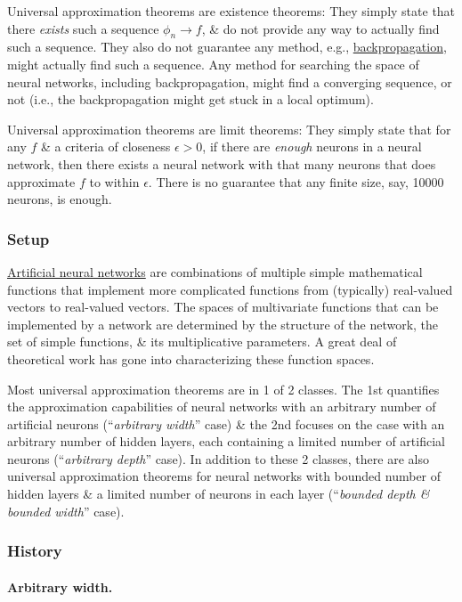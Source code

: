 \documentclass{article}
\begin{document}
Universal approximation theorems are existence theorems: They simply state that there {\it exists} such a sequence $\phi_n\to f$, \& do not provide any way to actually find such a sequence. They also do not guarantee any method, e.g., \href{https://en.wikipedia.org/wiki/Backpropagation}{backpropagation}, might actually find such a sequence. Any method for searching the space of neural networks, including backpropagation, might find a converging sequence, or not (i.e., the backpropagation might get stuck in a local optimum).

Universal approximation theorems are limit theorems: They simply state that for any $f$ \& a criteria of closeness $\epsilon > 0$, if there are {\it enough} neurons in a neural network, then there exists a neural network with that many neurons that does approximate $f$ to within $\epsilon$. There is no guarantee that any finite size, say, 10000 neurons, is enough.

\subsubsection{Setup}
\href{https://en.wikipedia.org/wiki/Artificial_neural_networks}{Artificial neural networks} are combinations of multiple simple mathematical functions that implement more complicated functions from (typically) real-valued vectors to real-valued vectors. The spaces of multivariate functions that can be implemented by a network are determined by the structure of the network, the set of simple functions, \& its multiplicative parameters. A great deal of theoretical work has gone into characterizing these function spaces.

Most universal approximation theorems are in 1 of 2 classes. The 1st quantifies the approximation capabilities of neural networks with an arbitrary number of artificial neurons (``{\it arbitrary width}'' case) \& the 2nd focuses on the case with an arbitrary number of hidden layers, each containing a limited number of artificial neurons (``{\it arbitrary depth}'' case). In addition to these 2 classes, there are also universal approximation theorems for neural networks with bounded number of hidden layers \& a limited number of neurons in each layer (``{\it bounded depth \& bounded width}'' case).

\subsubsection{History}

\paragraph{Arbitrary width.}
\end{document}
